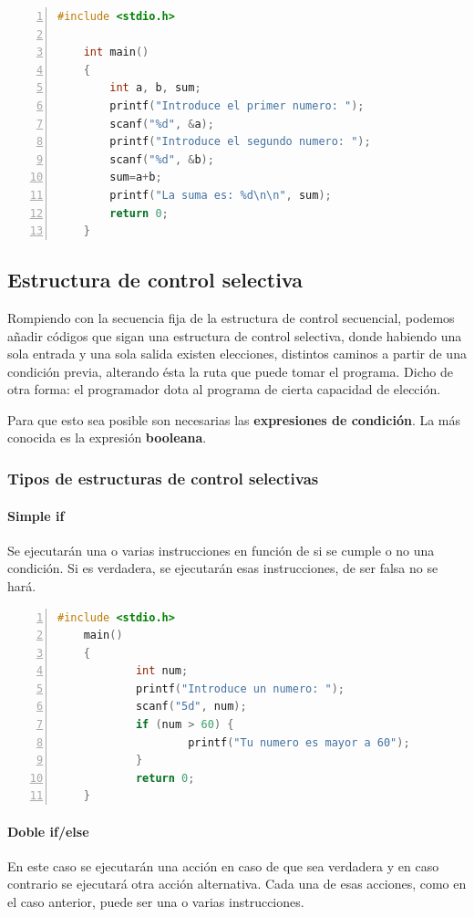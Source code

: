 \documentclass[a4paper, 11pt, titlepage]{article}
\begin{document}
        \begin{lstlisting}[language=C,numbers=left]
    #include <stdio.h>

    int main()
    {
        int a, b, sum;
        printf("Introduce el primer numero: ");
        scanf("%d", &a);
        printf("Introduce el segundo numero: ");
        scanf("%d", &b);
        sum=a+b;
        printf("La suma es: %d\n\n", sum);
        return 0;
    }\end{lstlisting}

    \subsection{Estructura de control selectiva}

        Rompiendo con la secuencia fija de la estructura de control secuencial, podemos añadir códigos que sigan
        una estructura de control selectiva, donde habiendo una sola entrada y una sola salida existen elecciones, 
        distintos caminos a partir de una condición previa, alterando ésta la ruta que puede tomar el programa.
        Dicho de otra forma: el programador dota al programa de cierta capacidad de elección.

        Para que esto sea posible son necesarias las \textbf{expresiones de condición}. La 
        más conocida es la expresión \textbf{booleana}.

        \subsubsection{Tipos de estructuras de control selectivas}

            \paragraph{Simple if} Se ejecutarán una o varias instrucciones en función de si se cumple o no una 
            condición. Si es verdadera, se ejecutarán esas instrucciones, de ser falsa no se hará.

            \begin{lstlisting}[language=C,numbers=left]
    #include <stdio.h>
    main()
    {
            int num;
            printf("Introduce un numero: ");
            scanf("5d", num);
            if (num > 60) {
                    printf("Tu numero es mayor a 60");
            }
            return 0;
    }\end{lstlisting} 

            \paragraph{Doble if/else} En este caso se ejecutarán una acción en caso de que sea 
            verdadera y en caso contrario se ejecutará otra acción alternativa. Cada una de 
            esas acciones, como en el caso anterior, puede ser una o varias instrucciones.
            
\end{document}
